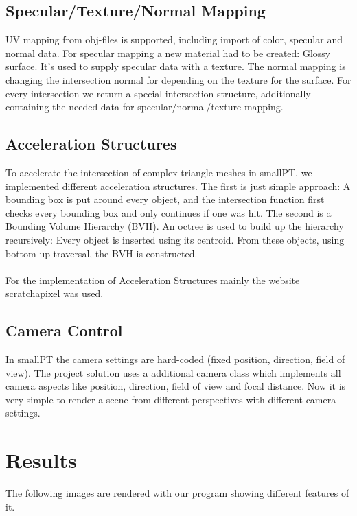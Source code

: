 \documentclass[11pt,a4paper]{article}
\begin{document}
\subsection{Specular/Texture/Normal Mapping}
UV mapping from obj-files is supported, including import of color, specular and normal data.
For specular mapping a new material had to be created: Glossy surface. It's used to supply specular data with a texture. The normal mapping is changing the intersection normal for depending on the texture for the surface. 
For every intersection we return a special intersection structure, additionally containing the needed data for specular/normal/texture mapping. 

\subsection{Acceleration Structures}
To accelerate the intersection of complex triangle-meshes in smallPT, we implemented different acceleration structures. 
The first is just simple approach: A bounding box is put around every object, and the intersection function first checks every bounding box and only continues if one was hit.
The second is a  Bounding Volume Hierarchy (BVH). An octree is used to build up the hierarchy recursively: Every object is inserted using its centroid. From these objects, using bottom-up traversal, the BVH is constructed.
\\
\\
For the implementation of Acceleration Structures mainly the website scratchapixel \cite{link:scratch}
was used.

\subsection{Camera Control}
In smallPT the camera settings are hard-coded (fixed position, direction, field of view). The project solution uses a additional camera class which implements all camera aspects like position, direction, field of view and focal distance. Now it is very simple to render a scene from different perspectives with different camera settings.

\section{Results}
The following images are rendered with our program showing different features of it.
\end{document}
